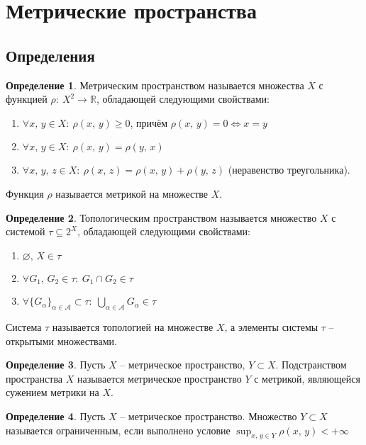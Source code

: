 \documentclass[a4paper,12pt]{article}
\renewcommand{\geq}{\ensuremath{\geqslant}}
\renewcommand{\emptyset}{\ensuremath{\varnothing}}
\theoremstyle{plain}
\theoremstyle{definition}
\newtheorem{definition}{Определение}[section]
\theoremstyle{remark}
\begin{document}
\tableofcontents
\newpage

\section{Метрические пространства}

\subsection{Определения}
\begin{definition}
	Метрическим пространством называется множества $X$ с функцией $\rho :\: X^2 \to \mathbb{R}$, обладающей следующими свойствами:
	\begin{enumerate}
		\item $\forall x,\, y \in X :\: \rho(x,\,y) \geq 0$, причём $\rho(x,\,y) = 0 \Leftrightarrow x = y$
		\item $\forall x,\, y \in X :\: \rho(x,\,y) = \rho(y,\,x)$
		\item $\forall x,\,y,\,z \in X :\: \rho(x,\, z) = \rho(x,\,y) + \rho(y,\,z)$ (неравенство треугольника).
	\end{enumerate}
	Функция $\rho$ называется метрикой на множестве $X$.
\end{definition}

\begin{definition}
	Топологическим пространством называется множество $X$ с системой $\tau \subseteq 2^X$, обладающей следующими свойствами:
	\begin{enumerate}
		\item $\emptyset,\, X \in \tau$
		\item $\forall G_1,\, G_2 \in \tau :\: G_1 \cap G_2 \in \tau$
		\item $\forall \{G_\alpha\}_{\alpha \in \mathcal{A}} \subset \tau :\: \bigcup_{\alpha \in \mathcal{A}} G_\alpha \in \tau$
	\end{enumerate}
	Система $\tau$ называется топологией на множестве $X$, а элементы системы $\tau$ -- открытыми множествами.
\end{definition}

\begin{definition}
	Пусть $X$ -- метрическое пространство, $Y \subset X$. Подстранством пространства $X$ называется метрическое пространство $Y$ с метрикой, являющейся сужением метрики на $X$.
\end{definition}

\begin{definition}
	Пусть $X$ -- метрическое пространство. Множество $Y \subset X$ называется ограниченным, если выполнено условие $\sup_{x,\, y \in Y}\rho(x,\,y) < +\infty$
\end{definition}
\end{document}
